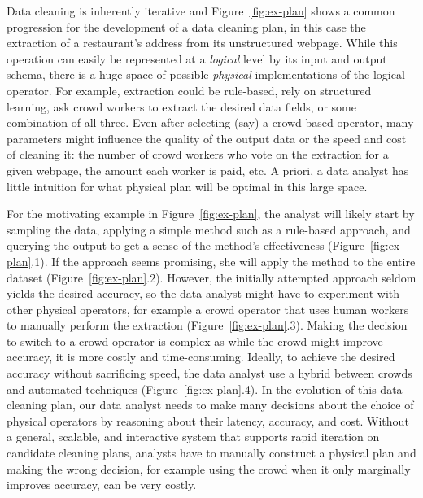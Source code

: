 Data cleaning is inherently iterative and Figure~\ref{fig:ex-plan} shows a common progression for the development of a data cleaning plan, in this case the extraction of a restaurant's address from its unstructured webpage.
While this operation can easily be represented at a \textit{logical} level by its input and output schema, there is a huge space of possible \textit{physical} implementations of the logical operator. 
For example, extraction could be rule-based, rely on structured learning, ask crowd workers to extract the desired data fields, or some combination of all three.
Even after selecting (say) a crowd-based operator, many parameters might influence the quality of the output data or the speed and cost of cleaning it: the number of crowd workers who vote on the extraction for a given webpage, the amount each worker is paid, etc.
A priori, a data analyst has little intuition for what physical plan will be optimal in this large space.

For the motivating example in Figure~\ref{fig:ex-plan}, the analyst will likely start by sampling the data, applying a simple method such as a rule-based approach, and querying the output to get a sense of the method's effectiveness (Figure~\ref{fig:ex-plan}.1).
If the approach seems promising, she will apply the method to the entire dataset (Figure~\ref{fig:ex-plan}.2).
However, the initially attempted approach seldom yields the desired accuracy, so the data analyst might have to experiment with other physical operators, for example a crowd operator that uses human workers to manually perform the extraction (Figure~\ref{fig:ex-plan}.3).
Making the decision to switch to a crowd operator is complex as while the crowd might improve accuracy, it is more costly and time-consuming.
Ideally, to achieve the desired accuracy without sacrificing speed, the data analyst use a hybrid between crowds and automated techniques (Figure~\ref{fig:ex-plan}.4).
In the evolution of this data cleaning plan, our data analyst needs to make many decisions about the choice of physical operators by reasoning about their latency, accuracy, and cost.
Without a general, scalable, and interactive system that supports rapid iteration on candidate cleaning plans, analysts have to manually construct a physical plan and making the wrong decision, for example using the crowd when it only marginally improves accuracy, can be very costly.



